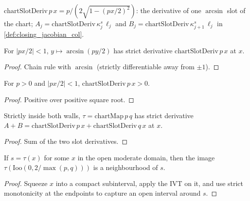 \begin{definition}
  \label{def:chart_slot_deriv}
  $\mathrm{chartSlotDeriv}\,p\,x = p / (2\sqrt{1 - (px/2)^2})$: the derivative
  of one $\arcsin$ slot of the chart; $A_j = \mathrm{chartSlotDeriv}\,
  \kappa^s_j\,\ell_j$ and $B_j = \mathrm{chartSlotDeriv}\,\kappa^s_{j+1}\,
  \ell_j$ in \cref{def:closing_jacobian_col}.
\end{definition}

\begin{lemma}
  \label{lem:has_strict_deriv_at_arcsin_slot}
  For $|px/2| < 1$, $y \mapsto \arcsin(py/2)$ has strict derivative
  $\mathrm{chartSlotDeriv}\,p\,x$ at $x$.
\end{lemma}
\begin{proof}

\leanok
  Chain rule with $\arcsin$ (strictly differentiable away from $\pm1$).
\end{proof}

\begin{lemma}
  \label{lem:chart_slot_deriv_pos}
  For $p > 0$ and $|px/2| < 1$, $\mathrm{chartSlotDeriv}\,p\,x > 0$.
\end{lemma}
\begin{proof}

\leanok
  Positive over positive square root.
\end{proof}

\begin{lemma}
  \label{lem:has_strict_deriv_at_chart_map}
  Strictly inside both walls, $\tau = \mathrm{chartMap}\,p\,q$ has strict
  derivative $A + B = \mathrm{chartSlotDeriv}\,p\,x +
  \mathrm{chartSlotDeriv}\,q\,x$ at $x$.
\end{lemma}
\begin{proof}

\leanok
  Sum of the two slot derivatives.
\end{proof}

\begin{lemma}
  \label{lem:chart_map_image_mem_nhds}
  If $s = \tau(x)$ for some $x$ in the open moderate domain, then the image
  $\tau(\mathrm{Ioo}(0, 2/\max(p,q)))$ is a neighbourhood of $s$.
\end{lemma}
\begin{proof}

\leanok
  Squeeze $x$ into a compact subinterval, apply the IVT on it, and use strict
  monotonicity at the endpoints to capture an open interval around $s$.
\end{proof}

